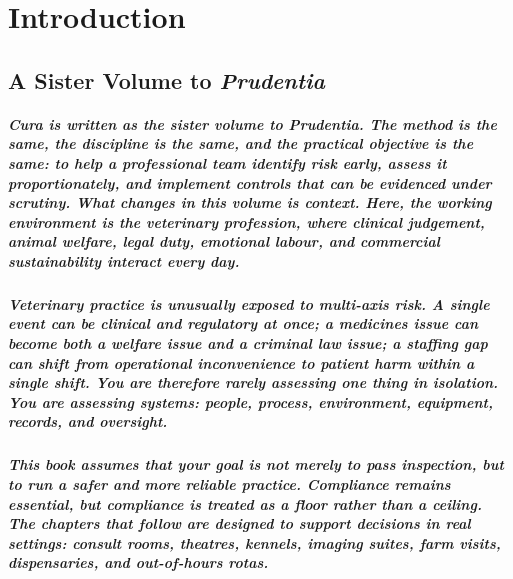 \chapter{Introduction}
\label{chap:Introduction}

\section{A Sister Volume to \textit{Prudentia}}

\paragraph{\textit{Cura} is written as the sister volume to \textit{Prudentia}. The method is the same, the discipline is the same, and the practical objective is the same: to help a professional team identify risk early, assess it proportionately, and implement controls that can be evidenced under scrutiny. What changes in this volume is context. Here, the working environment is the veterinary profession, where clinical judgement, animal welfare, legal duty, emotional labour, and commercial sustainability interact every day.}

\paragraph{Veterinary practice is unusually exposed to multi-axis risk. A single event can be clinical and regulatory at once; a medicines issue can become both a welfare issue and a criminal law issue; a staffing gap can shift from operational inconvenience to patient harm within a single shift. You are therefore rarely assessing one thing in isolation. You are assessing systems: people, process, environment, equipment, records, and oversight.}

\paragraph{This book assumes that your goal is not merely to pass inspection, but to run a safer and more reliable practice. Compliance remains essential, but compliance is treated as a floor rather than a ceiling. The chapters that follow are designed to support decisions in real settings: consult rooms, theatres, kennels, imaging suites, farm visits, dispensaries, and out-of-hours rotas.}

